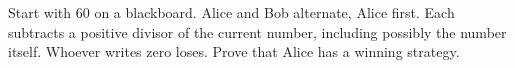 Start with $60$ on a blackboard. Alice and Bob alternate, Alice first. Each subtracts a positive divisor of the current number, including possibly the number itself. Whoever writes zero loses. Prove that Alice has a winning strategy.
